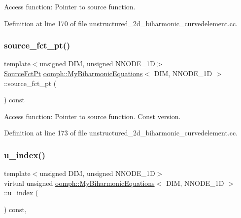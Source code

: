 Access function\+: Pointer to source function. 



Definition at line 170 of file unstructured\+\_\+2d\+\_\+biharmonic\+\_\+curvedelement.\+cc.

\mbox{\label{classoomph_1_1MyBiharmonicEquations_a1c2d7933266cf773e3729fb236bc13be}} 
\subsubsection{\texorpdfstring{source\+\_\+fct\+\_\+pt()}{source\_fct\_pt()}\hspace{0.1cm}{\footnotesize\ttfamily [4/4]}}
{\footnotesize\ttfamily template$<$unsigned D\+IM, unsigned N\+N\+O\+D\+E\+\_\+1D$>$ \\
\hyperlink{classoomph_1_1MyBiharmonicEquations_a17bd58054c66229016eb1c52eab36bc1}{Source\+Fct\+Pt} \hyperlink{classoomph_1_1MyBiharmonicEquations}{oomph\+::\+My\+Biharmonic\+Equations}$<$ D\+IM, N\+N\+O\+D\+E\+\_\+1D $>$\+::source\+\_\+fct\+\_\+pt (\begin{DoxyParamCaption}{ }\end{DoxyParamCaption}) const\hspace{0.3cm}{\ttfamily [inline]}}



Access function\+: Pointer to source function. Const version. 



Definition at line 173 of file unstructured\+\_\+2d\+\_\+biharmonic\+\_\+curvedelement.\+cc.

\mbox{\label{classoomph_1_1MyBiharmonicEquations_a541bbdb24f7849dd5c5a20f3d132a04b}} 
\subsubsection{\texorpdfstring{u\+\_\+index()}{u\_index()}}
{\footnotesize\ttfamily template$<$unsigned D\+IM, unsigned N\+N\+O\+D\+E\+\_\+1D$>$ \\
virtual unsigned \hyperlink{classoomph_1_1MyBiharmonicEquations}{oomph\+::\+My\+Biharmonic\+Equations}$<$ D\+IM, N\+N\+O\+D\+E\+\_\+1D $>$\+::u\+\_\+index (\begin{DoxyParamCaption}{ }\end{DoxyParamCaption}) const\hspace{0.3cm}{\ttfamily [inline]}, {\ttfamily [virtual]}}



